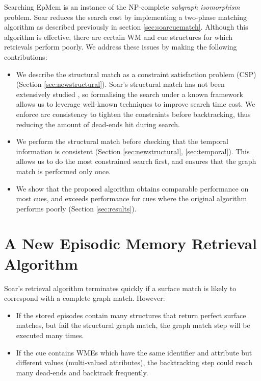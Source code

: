 \documentclass[envcountsame]{llncs}
\begin{document}
  Searching EpMem is an instance of the NP-complete \emph{subgraph isomorphism} problem.
  Soar reduces the search cost by implementing a two-phase matching algorithm as described previously in section \ref{sec:soarcuematch}.
  Although this algorithm is effective, there are certain WM and cue structures for which retrievals perform poorly.
  We address these issues by making the following contributions:
  \begin{itemize}
    \item
      We describe the structural match as a constraint satisfaction problem (CSP) (Section \ref{sec:newstructural}).
      Soar's structural match has not been extensively studied \cite{derbinsky2012effective}, so formalising the search under a known framework allows us to leverage well-known techniques to improve search time cost.
      We enforce arc consistency to tighten the constraints before backtracking, thus reducing the amount of dead-ends hit during search.
    \item
      We perform the structural match before checking that the temporal information is consistent (Section \ref{sec:newstructural}, \ref{sec:temporal}). This allows us to do the most constrained search first, and ensures that the graph match is performed only once.
    \item
      We show that the proposed algorithm obtains comparable performance on most cues, and exceeds performance for cues where the original algorithm performs poorly (Section \ref{sec:results}).
  \end{itemize}
  

\section{A New Episodic Memory Retrieval Algorithm} 

  Soar's retrieval algorithm terminates quickly if a surface match is likely to correspond with a complete graph match. However:
  \begin{itemize}
    \item
      If the stored episodes contain many structures that return perfect surface matches, but fail the structural graph match, the graph match step will be executed many times.
    \item
      If the cue contains WMEs which have the same identifier and attribute but different values (multi-valued attributes), the backtracking step could reach many dead-ends and backtrack frequently.
  \end{itemize}
  
\end{document}
